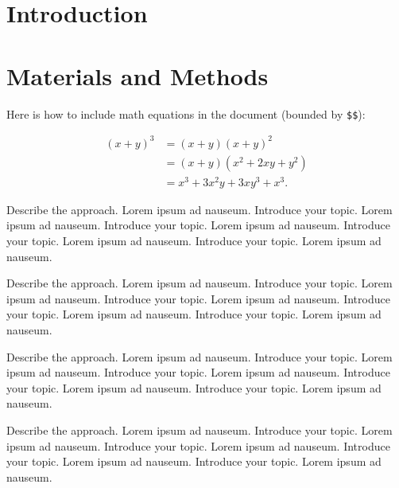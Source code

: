 \documentclass{bioinfo}
\begin{document}
\section{Introduction}

\section{Materials and Methods}

Here is how to include math equations in the document (bounded by
\texttt{\$\$}):

\[
\begin{aligned}
(x+y)^3&=(x+y)(x+y)^2\\
       &=(x+y)(x^2+2xy+y^2) \label{eqn:example} \\
       &=x^3+3x^2y+3xy^3+x^3. 
\end{aligned}
\]

Describe the approach. Lorem ipsum ad nauseum. Introduce your topic.
Lorem ipsum ad nauseum. Introduce your topic. Lorem ipsum ad nauseum.
Introduce your topic. Lorem ipsum ad nauseum. Introduce your topic.
Lorem ipsum ad nauseum.

Describe the approach. Lorem ipsum ad nauseum. Introduce your topic.
Lorem ipsum ad nauseum. Introduce your topic. Lorem ipsum ad nauseum.
Introduce your topic. Lorem ipsum ad nauseum. Introduce your topic.
Lorem ipsum ad nauseum.

Describe the approach. Lorem ipsum ad nauseum. Introduce your topic.
Lorem ipsum ad nauseum. Introduce your topic. Lorem ipsum ad nauseum.
Introduce your topic. Lorem ipsum ad nauseum. Introduce your topic.
Lorem ipsum ad nauseum.

Describe the approach. Lorem ipsum ad nauseum. Introduce your topic.
Lorem ipsum ad nauseum. Introduce your topic. Lorem ipsum ad nauseum.
Introduce your topic. Lorem ipsum ad nauseum. Introduce your topic.
Lorem ipsum ad nauseum.
\end{document}
